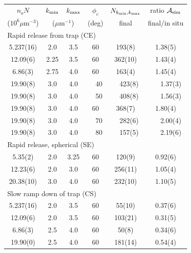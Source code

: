 	\begin{table}

	\begin{minipage}{0.5\textwidth}
	\vspace{0pt}
	\setlength{\tabcolsep}{0.5pt}
	{\fontsize{8}{11}\selectfont
	\begin{tabular}{c|ccc|c|c}
	\hline\hline
	$n_oN$	&$k_{\rm min}$&$k_{\rm max}$ & $\phi_c$ & $N_{k_{\rm min},k_{\rm max}}$	&ratio $\mathcal{A}_{\rm sim}$ 	\\
	($10^6\mu$m${}^{-3}$)& \multicolumn{2}{c|}{($\mu$m${}^{-1}$)}& (deg) &final& 	final/in situ\\
	\hline
	\multicolumn{6}{l}{Rapid release from trap (CE)}\\
	5.237(16)   & 2.0 & 3.5 & 60 & 193(8)    & 1.38(5)\\
	12.09(6)    & 2.25 & 3.5 & 60 & 362(10)   & 1.43(4)\\
    6.86(3)     & 2.75 & 4.0 & 60 & 163(4)   & 1.45(4)\\
    19.90(8)    & 3.0 & 4.0 & \ \ 40 & \ \ 423(8)    & \ \ \ 1.37(3) \\
    19.90(8)    & 3.0 & 4.0 & \ \ 50 & \ \ 408(8)    & \ \ \ 1.56(3) \\
    19.90(8)    & 3.0 & 4.0 & 60 & 368(7)    & 1.80(4) \\
    19.90(8)    & 3.0 & 4.0 & \ \ 70 & \ \ 282(6)    & \ \ \ 2.00(4) \\
    19.90(8)    & 3.0 & 4.0 & \ \ 80 & \ \ 157(5)    & \ \ \ 2.19(6) \\
	\hline
	\multicolumn{6}{l}{Rapid release, spherical (SE)}\\
	5.35(2)     & 2.0 & 3.25 & 60 & 120(9)    & 0.92(6)\\
	12.23(6)    & 2.0 & 3.0 & 60 & 256(11)   & 1.05(4)\\
    20.38(10)   & 3.0 & 4.0 & 60 & 232(10)    & 1.10(5) \\
	\hline
	\multicolumn{6}{l}{Slow ramp down of trap (CS)}\\
	5.237(16)   & 2.0 & 3.5 & 60 & 55(10)   & 0.37(6)\\
	12.09(6)    & 2.0 & 3.5 & 60 & 103(21)   & 0.31(5)\\
	6.86(3)     & 2.5 & 4.0 & 60 & 50(8)   & 0.34(6)\\   
	19.90(0)    & 2.5 & 4.0 & 60 & 181(14)   & 0.54(4)\\
	\hline\hline
	\end{tabular}
	}%
	\end{minipage}

\end{table}
